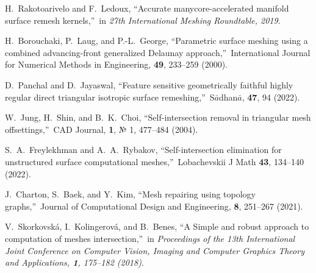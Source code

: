 \documentclass[
11pt,%
tightenlines,%
twoside,%
onecolumn,%
nofloats,%
nobibnotes,%
nofootinbib,%
superscriptaddress,%
noshowpacs,%
centertags]%
{revtex4-2}
\begin{document}
\begin{thebibliography}{99}
H.~Rakotoarivelo and F.~Ledoux, \textquotedblleft Accurate manycore-accelerated manifold surface remesh kernels,\textquotedblright \ in \textit{27th International Meshing Roundtable, 2019}.

H.~Borouchaki, P.~Laug, and P.-L.~George, \textquotedblleft Parametric surface meshing using a combined advancing-front generalized Delaunay approach,\textquotedblright \ International Journal for Numerical Methods in Engineering, {\bf 49}, 233--259 (2000).

D.~Panchal and D.~Jayaswal, \textquotedblleft Feature sensitive geometrically faithful highly regular direct triangular isotropic surface remeshing,\textquotedblright \ S$\bar{a}$dhan$\bar{a}$, {\bf 47}, 94 (2022).


W.~Jung, H.~Shin, and B.~K.~Choi, \textquotedblleft Self-intersection removal in triangular mesh offsettings,\textquotedblright \ CAD Journal, {\bf 1}, № 1, 477--484 (2004).

S.~A.~Freylekhman and A.~A.~Rybakov, \textquotedblleft Self-intersection elimination for unstructured surface computational meshes,\textquotedblright \ Lobachevskii J Math {\bf 43}, 134--140 (2022).

J.~Charton, S.~Baek, and Y.~Kim, \textquotedblleft Mesh repairing using topology graphs,\textquotedblright \ Journal of Computational Design and Engineering, {\bf 8}, 251--267 (2021).

V.~Skorkovsk\'a, I.~Kolingerov\'a, and B.~Benes, \textquotedblleft A Simple and robust approach to computation of meshes intersection,\textquotedblright \ in \textit{Proceedings of the 13th International Joint Conference on Computer Vision, Imaging and Computer Graphics Theory and Applications, {\bf 1}, 175--182 (2018)}.

\end{thebibliography}
\end{document}
